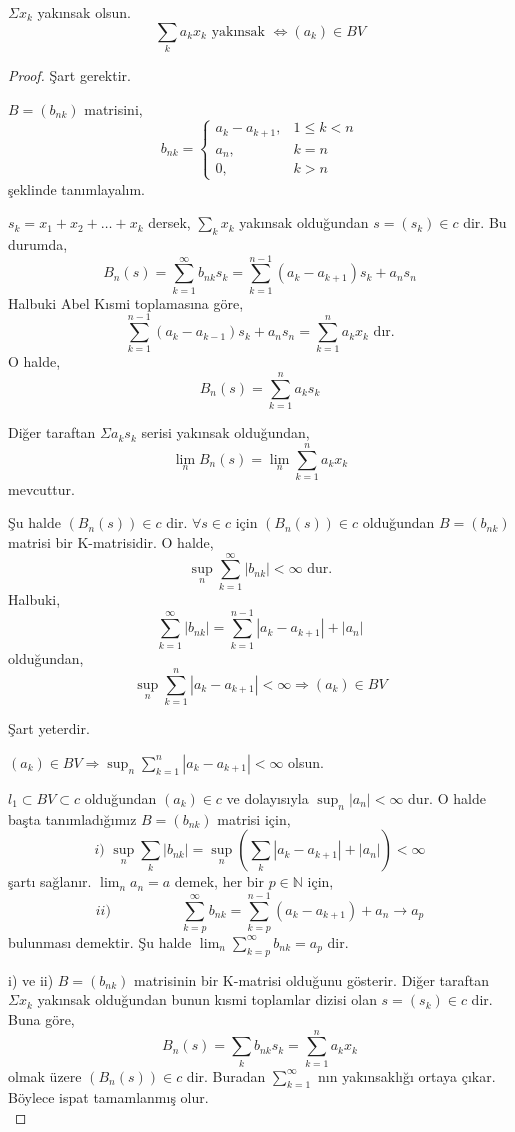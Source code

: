 \begin{corollary}
$\Sigma x_k$ yakınsak olsun.
$$
\sum_ka_kx_k\text{ yakınsak }\iff(a_k)\in BV
$$
\end{corollary}
\begin{proof}
Şart gerektir.

$B=(b_{nk})$ matrisini,
$$
b_{nk}=\begin{cases}
a_k-a_{k+1}, & 1\leq k<n\\
a_n, & k=n\\
0, & k>n
\end{cases}
$$
şeklinde tanımlayalım.

$s_k=x_1+x_2+\ldots+x_k$ dersek, $\sum\limits_kx_k$ yakınsak olduğundan $s=(s_k)\in c$ dir. Bu durumda,
$$
B_n(s)=\sum\limits_{k=1}^\infty b_{nk}s_k=\sum\limits_{k=1}^{n-1}(a_k-a_{k+1})s_k+a_ns_n
$$
Halbuki Abel Kısmi toplamasına göre,
$$
\sum\limits_{k=1}^{n-1}(a_k-a_{k-1})s_k+a_ns_n=\sum\limits_{k=1}^na_kx_k\text{ dır.}
$$
O halde, $$B_n(s)=\sum\limits_{k=1}^na_ks_k$$

Diğer taraftan $\Sigma a_ks_k$ serisi yakınsak olduğundan,
$$
\lim_nB_n(s)=\lim_n\sum\limits_{k=1}^na_kx_k
$$
mevcuttur. 

Şu halde $(B_n(s))\in c$ dir. $\forall s\in c$ için $(B_n(s))\in c$ olduğundan $B=(b_{nk})$ matrisi bir K-matrisidir. O halde,
$$
\sup_n\sum\limits_{k=1}^{\infty}|b_{nk}|<\infty\text{ dur.}
$$
Halbuki,
$$
\sum\limits_{k=1}^{\infty}|b_{nk}|=\sum\limits_{k=1}^{n-1}|a_k-a_{k+1}|+|a_n|
$$
olduğundan,
$$
\sup_n\sum\limits_{k=1}^n|a_k-a_{k+1}|<\infty\Rightarrow(a_k)\in BV
$$

Şart yeterdir.

$(a_k)\in BV\Rightarrow\sup_n\sum\limits_{k=1}^n|a_k-a_{k+1}|<\infty$ olsun.

$l_1\subset BV\subset c$ olduğundan $(a_k)\in c$ ve dolayısıyla $\sup_n|a_n|<\infty$ dur. O halde başta tanımladığımız $B=(b_{nk})$ matrisi için,
$$
i)\,\,\sup_n\sum_k|b_{nk}|=\sup_n\left(\sum_k|a_k-a_{k+1}|+|a_n|\right)<\infty
$$
şartı sağlanır. $\lim_na_n=a$ demek, her bir $p\in\mathbb{N}$ için,
$$
ii)\qquad\qquad\quad\sum\limits_{k=p}^\infty b_{nk}=\sum\limits_{k=p}^{n-1}(a_k-a_{k+1})+a_n\to a_p
$$
bulunması demektir. Şu halde $\lim_n\sum\limits_{k=p}^\infty b_{nk}=a_p$ dir.

 i) ve ii) $B=(b_{nk})$ matrisinin bir K-matrisi olduğunu gösterir. Diğer taraftan $\Sigma x_k$ yakınsak olduğundan bunun kısmi toplamlar dizisi olan $s=(s_k)\in c$ dir. Buna göre,
$$
B_n(s)=\sum_kb_{nk}s_k=\sum\limits_{k=1}^na_kx_k
$$
olmak üzere $(B_n(s))\in c$ dir. Buradan $\sum\limits_{k=1}^\infty$ nın yakınsaklığı ortaya çıkar. Böylece ispat tamamlanmış olur.\\[5pt]
\end{proof}

